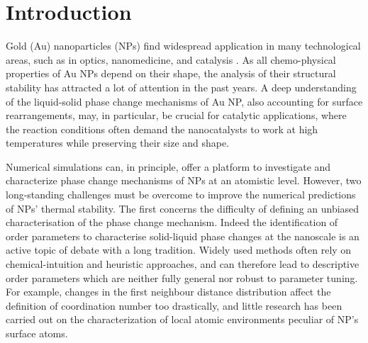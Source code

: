 \documentclass[%
aip,
 amsmath,amssymb,
 reprint,
]{revtex4-1}
\begin{document}
\maketitle

\section*{Introduction}
Gold (Au) nanoparticles (NPs) find widespread application in many technological areas, such as in optics,\cite{Amendola2017,Jauffred2019} nanomedicine,\cite{Dreaden2012,Carnovale2019} and catalysis \cite{Ha2018,Zhang2020,Carter2017,Mitsudome2013,Zhao2019}.
%
As all chemo-physical properties of Au NPs depend on their shape, the analysis of their structural stability has attracted a lot of attention in the past years.
%
A deep understanding of the liquid-solid phase change mechanisms of Au NP, also accounting for surface rearrangements, may, in particular, be crucial for catalytic applications, where the reaction conditions often demand the nanocatalysts to work at high temperatures while preserving their size and shape.

%
Numerical simulations can, in principle, offer a platform to investigate and characterize phase change mechanisms of NPs at an atomistic level.
%
However, two long-standing challenges must be overcome to improve the numerical predictions of NPs' thermal stability.
%
The first concerns the difficulty of defining an unbiased characterisation of the phase change mechanism.
%
Indeed the identification of order parameters to characterise solid-liquid phase changes at the nanoscale is an active topic of debate with a long tradition.\cite{Gilvarry1956, Honeycutt1987, Lechner2008, Delgado-Callico2020}
%
Widely used methods often rely on chemical-intuition and heuristic approaches, and can therefore lead to descriptive order parameters which are neither fully general nor robust to parameter tuning.
%
For example, changes in the first neighbour distance distribution affect the definition of coordination number too drastically, \cite{Li2008a, Fukuya2020} and little research has been carried out on the characterization of local atomic environments peculiar of NP's surface atoms.
\end{document}
